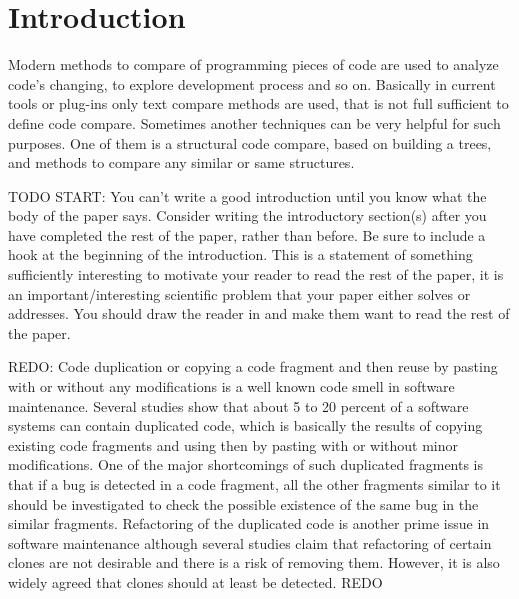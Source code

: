 \documentclass{report}
\begin{document}


\newpage
{}
\onehalfspacing
\large

\chapter{Introduction}

Modern methods to compare of programming pieces of code are used to analyze code's changing, to explore development process and so on. Basically in current tools or plug-ins only text compare methods are used, that is not full sufficient to define code compare.
Sometimes another techniques can be very helpful for such purposes. One of them is a structural code compare, based on building a trees, and methods to compare any similar or same structures. 

TODO START:
You can't write a good introduction until you know what the body of the paper says. Consider writing the introductory section(s) after you have completed the rest of the paper, rather than before.
Be sure to include a hook at the beginning of the introduction. This is a statement of something sufficiently interesting to motivate your reader to read the rest of the paper, it is an important/interesting scientific problem that your paper either solves or addresses. You should draw the reader in and make them want to read the rest of the paper. 

REDO:
Code duplication or copying a code fragment and then reuse by pasting with or
without any modifications is a well known code smell in software maintenance. Several
studies show that about 5 to 20 percent of a software systems can contain duplicated code,
which is basically the results of copying existing code fragments and using then by
pasting with or without minor modifications. One of the major shortcomings of such
duplicated fragments is that if a bug is detected in a code fragment, all the other
fragments similar to it should be investigated to check the possible existence of the
same bug in the similar fragments. Refactoring of the duplicated code is another prime
issue in software maintenance although several studies claim that refactoring of certain
clones are not desirable and there is a risk of removing them. However, it is also widely
agreed that clones should at least be detected.
REDO
\end{document}
